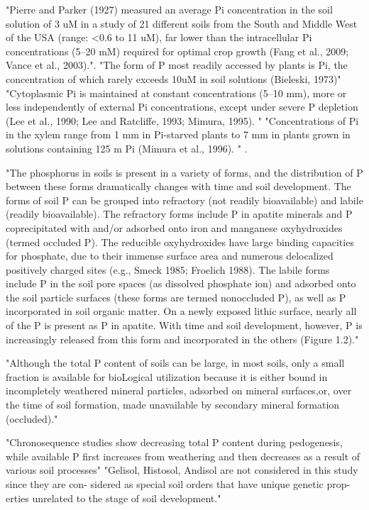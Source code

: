 \documentclass[10pt,letterpaper]{article}
\begin{document}
"Pierre and Parker (1927) measured an average Pi concentration in the soil solution of 3 uM in a study of 21 different soils from the South and Middle West of the USA (range: <0.6 to 11 uM), far lower than the intracellular Pi concentrations (5–20 mM) required for optimal crop growth (Fang et al., 2009; Vance et al., 2003)."\cite{Lambers:2015ut}. "The form of P most readily accessed by plants is Pi, the concentration of which rarely exceeds 10uM in soil solutions (Bieleski, 1973)" \cite{Schachtman:1998vv} "Cytoplasmic Pi is maintained at constant concentrations (5–10 mm), more or less independently of external Pi concentrations, except under severe P depletion (Lee et al., 1990; Lee and Ratcliffe, 1993; Mimura, 1995). " \cite{Schachtman:1998vv} "Concentrations of Pi in the xylem range from 1 mm in Pi-starved plants to 7 mm in plants grown in solutions containing 125  m Pi (Mimura et al., 1996). " \cite{Schachtman:1998vv}.

"The phosphorus in soils is present in a variety of forms, and the distribution of P between these forms dramatically changes with time and soil development. The forms of soil P can be grouped into refractory (not readily bioavailable) and labile (readily bioavailable). The refractory forms include P in apatite minerals and P coprecipitated with and/or adsorbed onto iron and manganese oxyhydroxides (termed occluded P). The reducible oxyhydroxides have large binding capacities for phosphate, due to their immense surface area and numerous delocalized positively charged sites (e.g., Smeck 1985; Froelich 1988). The labile forms include P in the soil pore spaces (as dissolved phosphate ion) and adsorbed onto the soil particle surfaces (these forms are termed nonoccluded P), as well as P incorporated in soil organic matter. On a newly exposed lithic surface, nearly all of the P is present as P in apatite. With time and soil development, however, P is increasingly released from this form and incorporated in the others (Figure 1.2)." \cite{Filipelli:6Zj8wyph}

"Although the total P content of soils can be large, in most soils, only a small fraction is available for bioLogical utilization because it is either bound in incompletely weathered mineral particles, adsorbed on mineral surfaces,or, over the time of soil formation, made unavailable by secondary mineral formation (occluded)." \cite{Yang:2013ft}

"Chronosequence studies show decreasing total P content during pedogenesis, while available P first increases from weathering and then decreases as a result of various soil processes" \cite{Yang:2013ft} "Gelisol, Histosol, Andisol are not considered in this study since they are con- sidered as special soil orders that have unique genetic prop- erties unrelated to the stage of soil development." \cite{Yang:2013ft}
\end{document}
